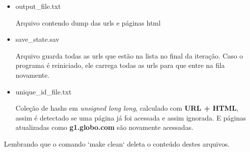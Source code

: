 \begin{itemize}
  \item output\_file.txt

  Arquivo contendo dump das urls e páginas html

  \item save\_state.sav

  Arquivo guarda todas as urls que estão na lista no final da iteração. Caso o programa é reiniciado, ele carrega todas as urls para que entre na fila novamente.

  \item unique\_id\_file.txt

  Coleção de hashs em \textit{unsigned long long}, calculado com \textbf{URL + HTML}, assim é detectado se uma página já foi acessada e assim ignorada. E páginas atualizadas como \textbf{g1.globo.com} são novamente acessadas.

\end{itemize}

Lembrando que o comando `make clean` deleta o conteúdo destes arquivos.
